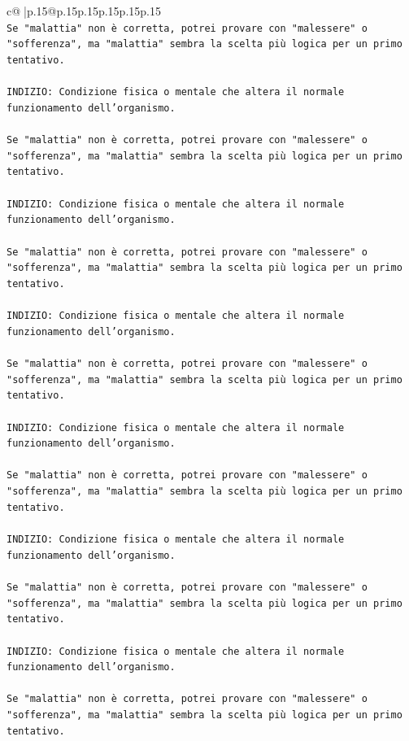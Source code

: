 \documentclass{article}
\begin{document}
{\begin{supertabular}{c@{$\;$}|p{.15\linewidth}@{}p{.15\linewidth}p{.15\linewidth}p{.15\linewidth}p{.15\linewidth}p{.15\linewidth}}
{{{\\ 
\texttt{Se "malattia" non è corretta, potrei provare con "malessere" o "sofferenza", ma "malattia" sembra la scelta più logica per un primo tentativo.} \\
\\ 
\texttt{INDIZIO: Condizione fisica o mentale che altera il normale funzionamento dell'organismo.} \\
\\ 
\texttt{Se "malattia" non è corretta, potrei provare con "malessere" o "sofferenza", ma "malattia" sembra la scelta più logica per un primo tentativo.} \\
\\ 
\texttt{INDIZIO: Condizione fisica o mentale che altera il normale funzionamento dell'organismo.} \\
\\ 
\texttt{Se "malattia" non è corretta, potrei provare con "malessere" o "sofferenza", ma "malattia" sembra la scelta più logica per un primo tentativo.} \\
\\ 
\texttt{INDIZIO: Condizione fisica o mentale che altera il normale funzionamento dell'organismo.} \\
\\ 
\texttt{Se "malattia" non è corretta, potrei provare con "malessere" o "sofferenza", ma "malattia" sembra la scelta più logica per un primo tentativo.} \\
\\ 
\texttt{INDIZIO: Condizione fisica o mentale che altera il normale funzionamento dell'organismo.} \\
\\ 
\texttt{Se "malattia" non è corretta, potrei provare con "malessere" o "sofferenza", ma "malattia" sembra la scelta più logica per un primo tentativo.} \\
\\ 
\texttt{INDIZIO: Condizione fisica o mentale che altera il normale funzionamento dell'organismo.} \\
\\ 
\texttt{Se "malattia" non è corretta, potrei provare con "malessere" o "sofferenza", ma "malattia" sembra la scelta più logica per un primo tentativo.} \\
\\ 
\texttt{INDIZIO: Condizione fisica o mentale che altera il normale funzionamento dell'organismo.} \\
\\ 
\texttt{Se "malattia" non è corretta, potrei provare con "malessere" o "sofferenza", ma "malattia" sembra la scelta più logica per un primo tentativo.} \\
}}}
\end{supertabular}}
\end{document}
